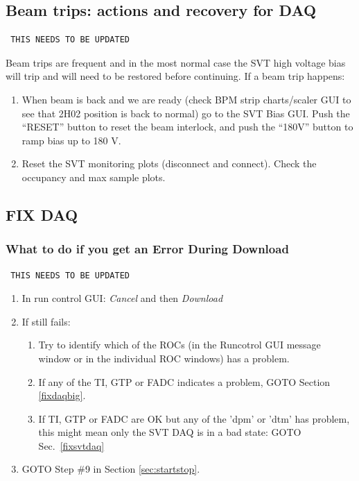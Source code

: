 \documentclass[12pt]{article}
\begin{document}
\subsection{Beam trips: actions and recovery for DAQ}

\begin{verbatim} THIS NEEDS TO BE UPDATED \end{verbatim}

Beam trips are frequent and in the most normal case the SVT high voltage bias will trip and will need to be restored before continuing.  If a beam trip happens:
\begin{enumerate}

\item When beam is back and we are ready (check BPM strip charts/scaler GUI to see that 2H02 position is back to normal) go to the SVT Bias GUI. Push the ``RESET'' button to reset the beam interlock, and push the ``180V'' button to ramp bias up to 180 V.

\item Reset the SVT monitoring plots (disconnect and connect). Check the occupancy and max sample plots.

\end{enumerate}


\newpage
\subsection{FIX DAQ}


\subsubsection{What to do if you get an Error During Download}

\begin{verbatim} THIS NEEDS TO BE UPDATED \end{verbatim}

\begin{enumerate}
    \item In run control GUI: {\em Cancel} and then {\em Download}
    \item If still fails:
    \begin{enumerate}
    	\item Try to identify which of the ROCs (in the Runcotrol GUI message window or in the individual ROC windows) has a problem. 
	\item If any of the TI, GTP or FADC indicates a problem,  GOTO Section \ref{fixdaqbig}.
	\item If TI, GTP or FADC are OK but any of the 'dpm' or 'dtm' has problem, this might mean only the SVT DAQ is in a bad state: GOTO Sec.~\ref{fixsvtdaq}
    \end{enumerate}
    \item GOTO Step \#9 in Section \ref{sec:startstop}.
\end{enumerate}
\end{document}

